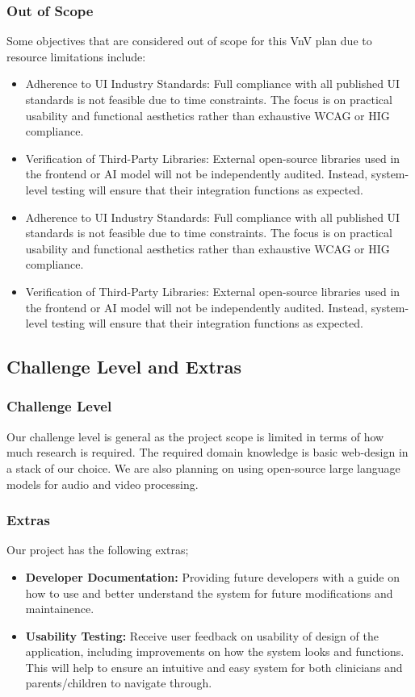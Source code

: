 \documentclass[12pt, titlepage]{article}
\begin{document}
\subsubsection*{Out of Scope}
Some objectives that are considered out of scope for this VnV plan due to resource limitations include:
\begin{itemize}
  \item Adherence to UI Industry Standards: Full compliance with all published UI standards is not feasible due to time constraints. The focus is on practical usability and functional aesthetics rather than exhaustive WCAG or HIG compliance.
  \item Verification of Third-Party Libraries: External open-source libraries used in the frontend or AI model will not be independently audited. Instead, system-level testing will ensure that their integration functions as expected.
  \item Adherence to UI Industry Standards: Full compliance with all published UI standards is not feasible due to time constraints. The focus is on practical usability and functional aesthetics rather than exhaustive WCAG or HIG compliance.
  \item Verification of Third-Party Libraries: External open-source libraries used in the frontend or AI model will not be independently audited. Instead, system-level testing will ensure that their integration functions as expected.
\end{itemize}
  
  
\subsection{Challenge Level and Extras}

\subsubsection{Challenge Level} 

Our challenge level is general as the project scope is limited in terms of how much
research is required. The required domain knowledge is basic web-design in a
stack of our choice. We are also planning on using open-source large language
models for audio and video processing.

\subsubsection{Extras}
Our project has the following extras;
\begin{itemize}
  \item \textbf{Developer Documentation: } Providing future developers with a guide on how to use and
  better understand the system for future modifications and maintainence. 
  \item \textbf{Usability Testing: } Receive user feedback on usability of design of the application, 
including improvements on how the system looks and functions. This will help to ensure an 
intuitive and easy system for both clinicians and parents/children to navigate through.
\end{itemize}
\end{document}
